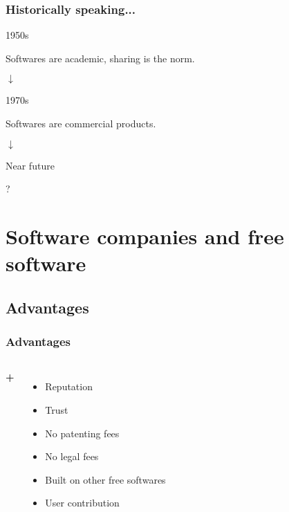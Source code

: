 \documentclass{beamer}
\begin{document}
\begin{frame}

  \frametitle{Historically speaking...}

  \begin{block}{1950s}
    \begin{center}Softwares are academic, sharing is the norm.\end{center}
  \end{block}

  \begin{center} $\downarrow$ \end{center}

  \begin{block}{1970s}
    \begin{center}Softwares are commercial products.\end{center}
  \end{block}

  \begin{center} $\downarrow$ \end{center}

  \begin{block}{Near future}
    \begin{center}?\end{center}
  \end{block}

\end{frame}

\section{Software companies and free software}

\subsection{Advantages}

\begin{frame}

  \frametitle{Advantages}

  \begin{columns}

    \Huge{\textbf{+}}

    \begin{itemize}
      \item<2->{Reputation}
      \item<3->{Trust}
      \item<4->{No patenting fees}
      \item<5->{No legal fees}
      \item<6->{Built on other free softwares}
      \item<7>{User contribution}
    \end{itemize}

  \end{columns}

\end{frame}
\end{document}
